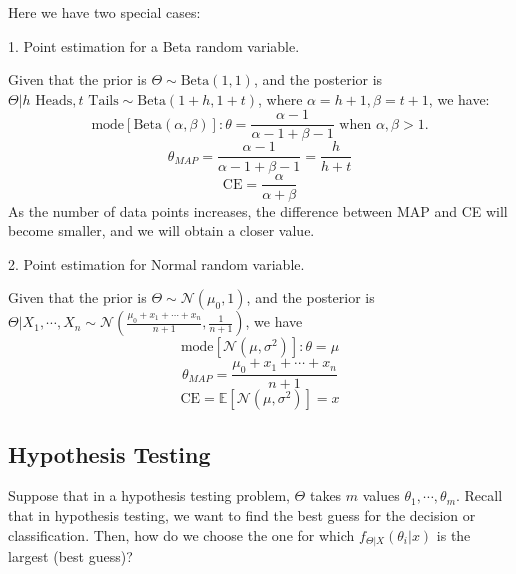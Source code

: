 Here we have two special cases: 

1. Point estimation for a Beta random variable.

Given that the prior is \(\Theta \sim \text{Beta}(1, 1)\), and the posterior is \(\Theta \vert h \text{ Heads}, t \text{ Tails} \sim \text{Beta}(1 + h, 1 + t)\), where \(\alpha = h + 1, \beta = t + 1\), we have: 
\[
  \text{mode}[\text{Beta}(\alpha, \beta)]: \theta = \dfrac{\alpha - 1}{\alpha - 1 + \beta - 1} \text{ when } \alpha, \beta >1.  
\]
\[
  \theta_{MAP} = \dfrac{\alpha - 1}{\alpha - 1 + \beta - 1} = \dfrac{h}{h + t}
\]
\[
  \text{CE} = \dfrac{\alpha}{\alpha + \beta}
\]
As the number of data points increases, the difference between MAP and CE will become smaller, and we will obtain a closer value. 

2. Point estimation for Normal random variable. 

Given that the prior is \(\Theta \sim \mathcal{N}(\mu_0, 1)\), and the posterior is \(\Theta \vert X_1, \cdots, X_n \sim \mathcal{N} (\frac{\mu_0 + x_1 + \cdots + x_n }{n + 1}, \frac{1}{n + 1})\), we have 
\[
  \text{mode}[\mathcal{N} (\mu, \sigma^2)]: \theta = \mu 
\]
\[
  \theta_{MAP} = \dfrac{\mu_0 + x_1 + \cdots + x_n }{n + 1}
\]
\[
  \text{CE} = \mathbb{E}[\mathcal{N} (\mu, \sigma^2)] = x
\]

\subsection{Hypothesis Testing}
Suppose that in a hypothesis testing problem, \(\Theta\) takes \(m\) values \(\theta_1, \cdots, \theta_m\). Recall that in hypothesis testing, we want to find the best guess for the decision or classification. Then, how do we choose the one for which \(f_{\Theta \vert X} (\theta_i \vert x)\) is the largest (best guess)?

